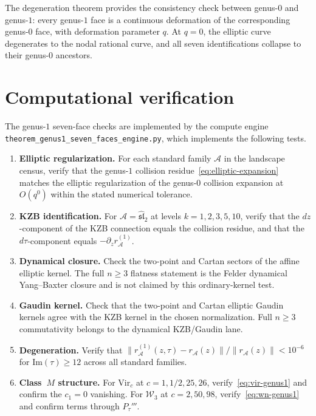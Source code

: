 \documentclass[11pt]{article}
\theoremstyle{plain}
\theoremstyle{definition}
\theoremstyle{remark}
\newcommand{\fsl}{\mathfrak{sl}}
\newcommand{\cA}{\mathcal{A}}
\newcommand{\cW}{\mathcal{W}}
\newcommand{\Vir}{\mathrm{Vir}}
\numberwithin{equation}{section}
\begin{document}
The degeneration theorem provides the consistency check between genus-$0$
and genus-$1$: every genus-$1$ face is a continuous deformation of the
corresponding genus-$0$ face, with deformation parameter $q$. At
$q = 0$, the elliptic curve degenerates to the nodal rational curve,
and all seven identifications collapse to their genus-$0$ ancestors.



\section{Computational verification}\label{sec:compute}

The genus-$1$ seven-face checks are implemented by the compute
engine \texttt{theorem\_genus1\_seven\_faces\_engine.py}, which
implements the following tests.

\begin{enumerate}[label=(\arabic*)]
\item \textbf{Elliptic regularization.} For each standard family
$\cA$ in the landscape census, verify that the genus-$1$ collision
residue~\eqref{eq:elliptic-expansion} matches the elliptic
regularization of the genus-$0$ collision expansion at \(O(q^0)\)
within the stated numerical tolerance.

\item \textbf{KZB identification.} For
$\cA = \widehat{\fsl}_2$ at levels $k = 1,2,3,5,10$, verify that the
$dz$-component of the KZB connection equals the collision residue, and
that the $d\tau$-component equals $-\partial_z r_\cA^{(1)}$.

\item \textbf{Dynamical closure.} Check the two-point and Cartan
sectors of the affine elliptic kernel. The full \(n\geq3\) flatness
statement is the Felder dynamical Yang--Baxter closure and is not
claimed by this ordinary-kernel test.

\item \textbf{Gaudin kernel.} Check that the two-point and Cartan
elliptic Gaudin kernels agree with the KZB kernel in the chosen
normalization. Full \(n\geq3\) commutativity belongs to the dynamical
KZB/Gaudin lane.

\item \textbf{Degeneration.} Verify that
$\|r_\cA^{(1)}(z,\tau) - r_\cA(z)\|/\|r_\cA(z)\| < 10^{-6}$
for $\mathrm{Im}(\tau) \geq 12$ across all standard families.

\item \textbf{Class~$M$ structure.} For $\Vir_c$ at
$c = 1, 1/2, 25, 26$, verify~\eqref{eq:vir-genus1} and confirm the
$c_1 = 0$ vanishing. For $\cW_3$ at $c = 2, 50, 98$,
verify~\eqref{eq:wn-genus1} and confirm terms through \(P_\tau'''\).
\end{enumerate}
\end{document}
